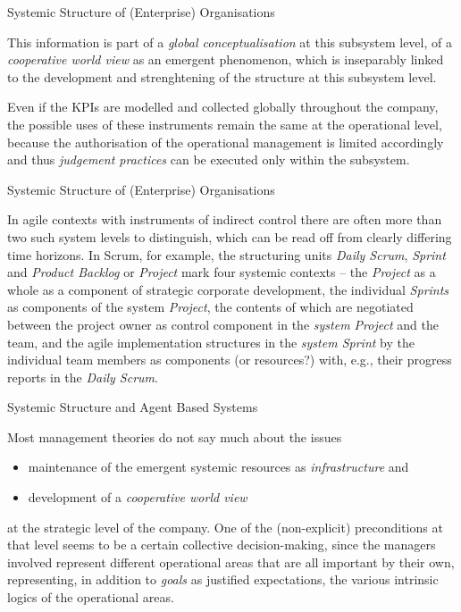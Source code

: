 \documentclass{beamer}
\begin{document}
\begin{frame}{Systemic Structure of (Enterprise) Organisations}

This information is part of a \emph{global conceptualisation} at this
subsystem level, of a \emph{cooperative world view} as an emergent phenomenon,
which is inseparably linked to the development and strenghtening of the
structure at this subsystem level.

Even if the KPIs are modelled and collected globally throughout the company,
the possible uses of these instruments remain the same at the operational
level, because the authorisation of the operational management is limited
accordingly and thus \emph{judgement practices} can be executed only within
the subsystem. 
\end{frame}

\begin{frame}{Systemic Structure of (Enterprise) Organisations}

In agile contexts with instruments of indirect control there are often more
than two such system levels to distinguish, which can be read off from clearly
differing time horizons.  In Scrum, for example, the structuring units
\emph{Daily Scrum}, \emph{Sprint} and \emph{Product Backlog} or \emph{Project}
mark four systemic contexts -- the \emph{Project} as a whole as a component of
strategic corporate development, the individual \emph{Sprints} as components
of the system \emph{Project}, the contents of which are negotiated between the
project owner as control component in the \emph{system Project} and the team,
and the agile implementation structures in the \emph{system Sprint} by the
individual team members as components (or resources?) with, e.g., their
progress reports in the \emph{Daily Scrum}.
\end{frame}

\begin{frame}{Systemic Structure and Agent Based Systems}

Most management theories do not say much about the issues
\begin{itemize}
\item maintenance of the emergent systemic resources as \emph{infrastructure}
  and 
\item development of a \emph{cooperative world view}
\end{itemize}
at the strategic level of the company. One of the (non-explicit) preconditions
at that level seems to be a certain collective decision-making, since the
managers involved represent different operational areas that are all important
by their own, representing, in addition to \emph{goals} as justified
expectations, the various intrinsic logics of the operational areas.

\end{frame}
\end{document}
